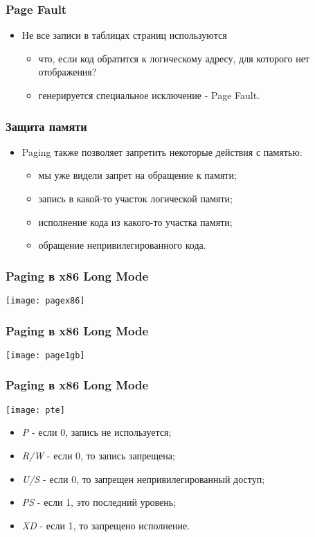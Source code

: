 \begin{frame}
\frametitle{Page Fault}
\begin{itemize}
    \item<1->Не все записи в таблицах страниц используются
    \begin{itemize}
        \item<1->что, если код обратится к логическому адресу, для которого нет
        отображения?
        \item<2->генерируется специальное исключение - Page Fault.
    \end{itemize}
\end{itemize}
\end{frame}

\begin{frame}
\frametitle{Защита памяти}
\begin{itemize}
    \item<1->Paging также позволяет запретить некоторые действия с памятью:
    \begin{itemize}
        \item<2->мы уже видели запрет на обращение к памяти;
        \item<3->запись в какой-то участок логической памяти;
        \item<4->исполнение кода из какого-то участка памяти;
        \item<5->обращение непривилегированного кода.
    \end{itemize}
\end{itemize}
\end{frame}

\begin{frame}
\frametitle{Paging в x86 Long Mode}
\texttt{[image: pagex86]}
\end{frame}

\begin{frame}
\frametitle{Paging в x86 Long Mode}
\texttt{[image: page1gb]}
\end{frame}

\begin{frame}
\frametitle{Paging в x86 Long Mode}
\texttt{[image: pte]}
\begin{itemize}
    \item\emph{P} - если 0, запись не используется;
    \item\emph{R/W} - если 0, то запись запрещена;
    \item\emph{U/S} - если 0, то запрещен непривилегированный доступ;
    \item\emph{PS} - если 1, это последний уровень;
    \item\emph{XD} - если 1, то запрещено исполнение.
\end{itemize}
\end{frame}

